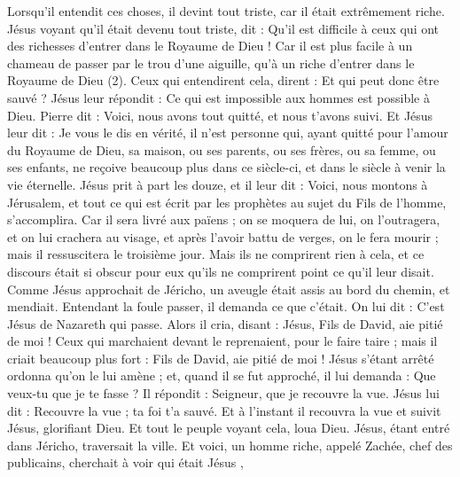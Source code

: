 \begin{multicols}{2}
Lorsqu’il entendit ces choses, il devint tout triste, car il était extrêmement riche.
Jésus voyant qu'il était devenu tout triste, dit : Qu’il est difficile à ceux qui ont des richesses d’entrer dans le Royaume de Dieu !
Car il est plus facile à un chameau de passer par le trou d'une aiguille, qu’à un riche d’entrer dans le Royaume de Dieu (2).
Ceux qui entendirent cela, dirent : Et qui peut donc être sauvé ?
Jésus leur répondit : Ce qui est impossible aux hommes est possible à Dieu.
Pierre dit : Voici, nous avons tout quitté, et nous t'avons suivi.
Et Jésus leur dit : Je vous le dis en vérité, il n’est personne qui, ayant quitté pour l'amour du Royaume de Dieu, sa maison, ou ses parents, ou ses frères, ou sa femme, ou ses enfants,
ne reçoive beaucoup plus dans ce siècle-ci, et dans le siècle à venir la vie éternelle.
Jésus prit à part les douze, et il leur dit : Voici, nous montons à Jérusalem, et tout ce qui est écrit par les prophètes au sujet du Fils de l'homme, s’accomplira.
Car il sera livré aux païens ; on se moquera de lui, on l’outragera, et on lui crachera au visage,
et après l’avoir battu de verges, on le fera mourir ; mais il ressuscitera le troisième jour.
Mais ils ne comprirent rien à cela, et ce discours était si obscur pour eux qu'ils ne comprirent point ce qu'il leur disait.
Comme Jésus approchait de Jéricho, un aveugle était assis au bord du chemin, et mendiait.
Entendant la foule passer, il demanda ce que c'était.
On lui dit : C’est Jésus de Nazareth qui passe.
Alors il cria, disant : Jésus, Fils de David, aie pitié de moi !
Ceux qui marchaient devant le reprenaient, pour le faire taire ; mais il criait beaucoup plus fort : Fils de David, aie pitié de moi !
Jésus s'étant arrêté ordonna qu'on le lui amène ; et, quand il se fut approché,
il lui demanda : Que veux-tu que je te fasse ? Il répondit : Seigneur, que je recouvre la vue.
Jésus lui dit : Recouvre la vue ; ta foi t'a sauvé.
Et à l'instant il recouvra la vue et suivit Jésus, glorifiant Dieu. Et tout le peuple voyant cela, loua Dieu.
\VerseOne{}Jésus, étant entré dans Jéricho, traversait la ville.
Et voici, un homme riche, appelé Zachée, chef des publicains, cherchait à voir qui était Jésus ,

\end{multicols}
